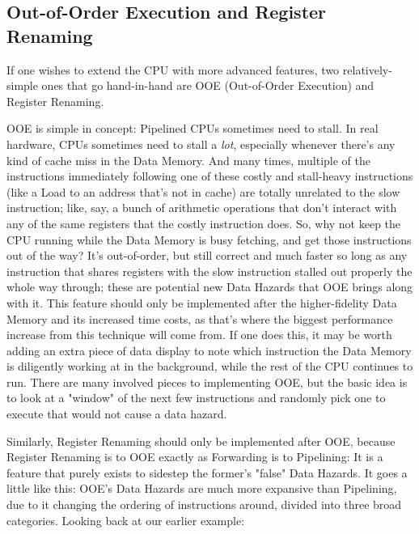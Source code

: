 \documentclass[12pt,twoside]{reedthesis}
\begin{document}
\subsection{Out-of-Order Execution and Register Renaming}

If one wishes to extend the CPU with more advanced features, two relatively-simple ones that go hand-in-hand are OOE (Out-of-Order Execution) and Register Renaming.

OOE is simple in concept: Pipelined CPUs sometimes need to stall. In real hardware, CPUs sometimes need to stall a \textit{lot}, especially whenever there's any kind of cache miss in the Data Memory. And many times, multiple of the instructions immediately following one of these costly and stall-heavy instructions (like a Load to an address that's not in cache) are totally unrelated to the slow instruction; like, say, a bunch of arithmetic operations that don't interact with any of the same registers that the costly instruction does. So, why not keep the CPU running while the Data Memory is busy fetching, and get those instructions out of the way? It's out-of-order, but still correct and much faster so long as any instruction that shares registers with the slow instruction stalled out properly the whole way through; these are potential new Data Hazards that OOE brings along with it. This feature should only be implemented after the higher-fidelity Data Memory and its increased time costs, as that's where the biggest performance increase from this technique will come from. If one does this, it may be worth adding an extra piece of data display to note which instruction the Data Memory is diligently working at in the background, while the rest of the CPU continues to run. There are many involved pieces to implementing OOE, but the basic idea is to look at a "window" of the next few instructions and randomly pick one to execute that would not cause a data hazard.

Similarly, Register Renaming should only be implemented after OOE, because Register Renaming is to OOE exactly as Forwarding is to Pipelining: It is a feature that purely exists to sidestep the former's "false" Data Hazards. It goes a little like this: OOE's Data Hazards are much more expansive than Pipelining, due to it changing the ordering of instructions around, divided into three broad categories. Looking back at our earlier example:
\end{document}
